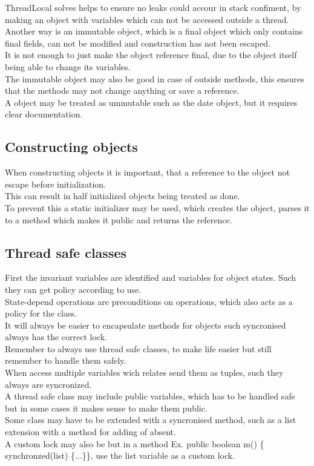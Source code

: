 \documentclass[12pt, a4paper]{article}
\begin{document}
		ThreadLocal solves helps to ensure no leaks could accour in stack confiment, by making an object with variables which can not be accessed outside a thread.\\
		Another way is an immutable object, which is a final object which only contains final fields, can not be modified and construction has not been escaped.\\
		It is not enough to just make the object reference final, due to the object itself being able to change its variables.\\
		The immutable object may also be good in case of outside methods, this ensures that the methods may not change anything or save a reference.\\
		A object may be treated as ummutable such as the date object, but it requires clear documentation.\\
		
		\subsection{Constructing objects}
			When constructing objects it is important, that a reference to the object not escape before initialization.\\
			This can result in half initialized objects being treated as done.\\
			To prevent this a static initializer may be used, which creates the object, parses it to a method which makes it public and returns the reference.
		\subsection{Thread safe classes}
			First the invariant variables are identified and variables for object states. Such they can get policy according to use.\\
			State-depend operations are preconditions on operations, which also acts as a policy for the class.\\
			It will always be easier to encapsulate methods for objects such syncronised always has the correct lock.\\
			Remember to always use thread safe classes, to make life easier but still remember to handle them safely.\\
			When access multiple variables wich relates send them as tuples, such they always are syncronized.\\
			A thread safe class may include public variables, which has to be handled safe but in some cases it makes sense to make them public.\\
			Some class may have to be extended with a syncronised method, such as a list extension with a method for adding of absent.\\
			A custom lock may also be but in a method Ex. public boolean m() \{ synchronzed(list) \{...\}\}, use the list variable as a custom lock.\\
\end{document}
